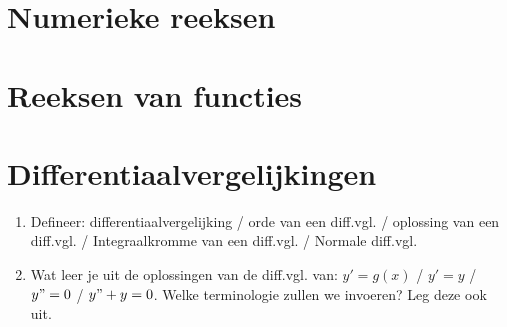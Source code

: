 \documentclass[a4paper,12pt]{article}
\begin{document}
    \section{Numerieke reeksen}
    

    \section{Reeksen van functies}
    

    \section{Differentiaalvergelijkingen}
    \begin{enumerate}
        \item Defineer: differentiaalvergelijking / orde van een diff.vgl. / oplossing van een diff.vgl. / Integraalkromme van een diff.vgl. / Normale diff.vgl.
        \item Wat leer je uit de oplossingen van de diff.vgl. van: $y'=g(x)$ / $y'=y$ / $y"=0$ / $y"+y=0$. Welke terminologie zullen we invoeren? Leg deze ook uit.
    \end{enumerate}
    
\end{document}
